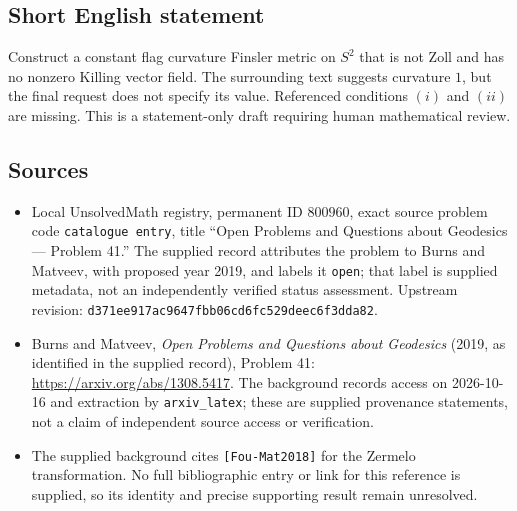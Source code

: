 \documentclass[11pt]{article}
\begin{document}
\subsection{Short English statement}
Construct a constant flag curvature Finsler metric on \(S^2\) that is not Zoll and has no nonzero Killing vector field. The surrounding text suggests curvature \(1\), but the final request does not specify its value. Referenced conditions \((i)\) and \((ii)\) are missing. This is a statement-only draft requiring human mathematical review.
\subsection{Sources}
\begin{itemize}
\item Local UnsolvedMath registry, permanent ID \(800960\), exact source problem code \texttt{catalogue entry}, title ``Open Problems and Questions about Geodesics --- Problem 41.'' The supplied record attributes the problem to Burns and Matveev, with proposed year 2019, and labels it \texttt{open}; that label is supplied metadata, not an independently verified status assessment. Upstream revision: \texttt{d371ee917ac9647fbb06cd6fc529deec6f3dda82}.
\item Burns and Matveev, \emph{Open Problems and Questions about Geodesics} (2019, as identified in the supplied record), Problem 41: \url{https://arxiv.org/abs/1308.5417}. The background records access on 2026-10-16 and extraction by \texttt{arxiv\_latex}; these are supplied provenance statements, not a claim of independent source access or verification.
\item The supplied background cites \texttt{[Fou-Mat2018]} for the Zermelo transformation. No full bibliographic entry or link for this reference is supplied, so its identity and precise supporting result remain unresolved.
\end{itemize}
\end{document}
